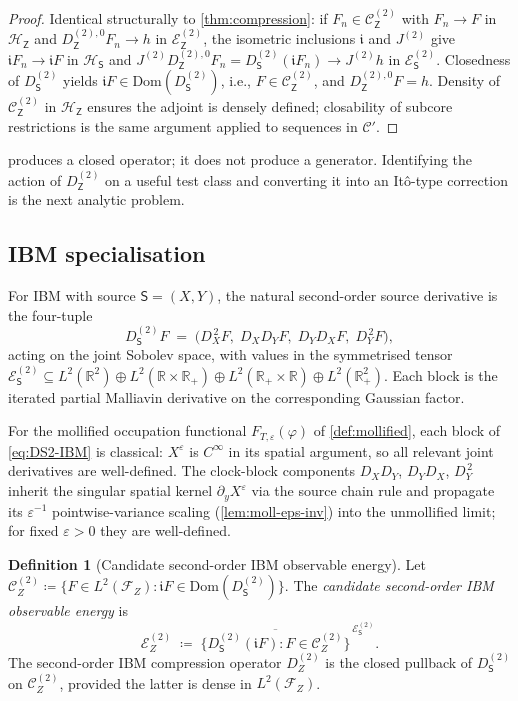 \documentclass[11pt,reqno]{amsart}
\theoremstyle{plain}
\theoremstyle{definition}
\newtheorem{definition}[theorem]{Definition}
\theoremstyle{remark}
\newcommand{\R}{\mathbb{R}}
\newcommand{\Hilb}{\mathcal{H}}
\newcommand{\Dom}{\mathrm{Dom}}
\newcommand{\Energy}{\mathcal{E}}
\newcommand{\Source}{\mathsf{S}}
\newcommand{\Obs}{\mathsf{Z}}
\renewcommand{\iota}{\mathfrak{i}}
\newcommand{\IBM}{Z}
\begin{document}
\begin{proof}
Identical structurally to \cref{thm:compression}: if $F_n\in
\mathcal C_\Obs^{(2)}$ with $F_n\to F$ in $\Hilb_\Obs$ and
$D_\Obs^{(2),0}F_n\to h$ in $\Energy_\Obs^{(2)}$, the isometric
inclusions $\iota$ and $J^{(2)}$ give $\iota F_n\to\iota F$ in
$\Hilb_\Source$ and $J^{(2)}D_\Obs^{(2),0}F_n=D_\Source^{(2)}(\iota F_n)
\to J^{(2)}h$ in $\Energy_\Source^{(2)}$. Closedness of
$D_\Source^{(2)}$ yields $\iota F\in\Dom(D_\Source^{(2)})$, i.e.,
$F\in\mathcal C_\Obs^{(2)}$, and $D_\Obs^{(2),0}F=h$. Density of
$\mathcal C_\Obs^{(2)}$ in $\Hilb_\Obs$ ensures the adjoint is
densely defined; closability of subcore restrictions is the same
argument applied to sequences in $\mathcal C'$.
\end{proof}

 produces a closed operator; it does not
produce a generator. Identifying the action of $D_\Obs^{(2)}$ on a
useful test class and converting it into an It\^o-type correction is
the next analytic problem.

\subsection*{IBM specialisation}

For IBM with source $\Source=(X,Y)$, the natural second-order source
derivative is the four-tuple
\begin{equation}\label{eq:DS2-IBM}
  D_\Source^{(2)}F
  \;=\;\bigl(D_X^{\,2}F,\;D_XD_YF,\;D_YD_XF,\;D_Y^{\,2}F\bigr),
\end{equation}
acting on the joint Sobolev space, with values in the symmetrised tensor
$\Energy_\Source^{(2)}\subseteq L^{2}(\R^{2})\oplus L^{2}(\R\times\R_{+})
\oplus L^{2}(\R_{+}\times\R)\oplus L^{2}(\R_{+}^{2})$.
Each block is the iterated partial Malliavin derivative on the
corresponding Gaussian factor.

For the mollified occupation functional $F_{T,\varepsilon}(\varphi)$ of
\cref{def:mollified}, each block of \eqref{eq:DS2-IBM} is classical:
$X^\varepsilon$ is $C^{\infty}$ in its spatial argument, so all
relevant joint derivatives are well-defined. The clock-block components
$D_XD_Y$, $D_YD_X$, $D_Y^{\,2}$ inherit the singular spatial kernel
$\partial_yX^\varepsilon$ via the source chain rule and propagate its
$\varepsilon^{-1}$ pointwise-variance scaling (\cref{lem:moll-eps-inv})
into the unmollified limit; for fixed $\varepsilon>0$ they are
well-defined.

\begin{definition}[Candidate second-order IBM observable energy]
\label{def:second-order-ibm}
Let $\mathcal C_\IBM^{(2)}\coloneqq\{F\in L^{2}(\mathcal F_\IBM):
\iota F\in\Dom(D_\Source^{(2)})\}$. The \emph{candidate second-order
IBM observable energy} is
\[
  \Energy_\IBM^{(2)}
  \;\coloneqq\;\overline{\bigl\{D_\Source^{(2)}(\iota F):F\in\mathcal
   C_\IBM^{(2)}\bigr\}}^{\,\Energy_\Source^{(2)}}.
\]
The second-order IBM compression operator $D_\IBM^{(2)}$ is the closed
pullback of $D_\Source^{(2)}$ on $\mathcal C_\IBM^{(2)}$, provided the
latter is dense in $L^{2}(\mathcal F_\IBM)$.
\end{definition}
\end{document}

